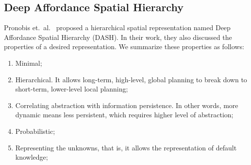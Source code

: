 \documentclass[10pt, titlepage]{article}
\theoremstyle{definition}
\begin{document}
\subsection{Deep Affordance Spatial Hierarchy}\label{section:dash}

Pronobis et.~al.~\cite{pronobis2017deep} proposed a hierarchical spatial representation named Deep Affordance Spatial Hierarchy (DASH). In their work, they also discussed the properties of a desired representation. We summarize these properties as follows: 

\begin{enumerate}[label=(\arabic*)]
    \item Minimal;
    \item Hierarchical. It allows long-term, high-level, global planning to break down to short-term, lower-level local planning;
    \item Correlating abstraction with information persistence. In other words, more dynamic means less persistent, which requires higher level of abstraction;
    \item Probabilistic;
    \item Representing the unknowns, that is, it allows the representation of default knowledge;
\end{enumerate}
\end{document}
